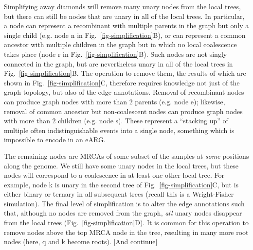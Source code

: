\documentclass{article}
\begin{document}
Simplifying away diamonds will remove many unary nodes from the
local trees, but there can still be nodes that are unary in all
of the local trees. In particular, a node can represent a recombinant
with multiple parents in the graph but only a single child (e.g. node \textsf{n}
in Fig.~\ref{fig-simplification}B), or can represent a common ancestor with
multiple children in the graph but in which no local coalescence takes place
(node \textsf{r} in Fig.~\ref{fig-simplification}B).
Such nodes are not singly connected in the graph, but are nevertheless unary in
all of the local trees in Fig.~\ref{fig-simplification}B. The operation to remove them,
the results of which are shown in Fig.~\ref{fig-simplification}C,
therefore requires knowledge not just of the graph topology, but also of the
edge annotations. Removal of recombinant nodes can produce graph nodes with
more than 2 parents (e.g. node \textsf{e}); likewise, removal of
common ancestor but non-coalescent nodes can produce graph nodes with
more than 2 children (e.g. node \textsf{s}). These represent a ``stacking up'' of multiple
often indistinguishable events into a single node, something which is impossible
to encode in an eARG.

The remaining nodes are MRCAs of some subset of the samples
at \emph{some} positions along the genome. We still have
some unary nodes in the local trees, but these nodes will
correspond to a coalescence in at least one other
local tree. For example, node  \textsf{k} is unary in the second tree
of Fig.~\ref{fig-simplification}C, but is either binary
or ternary in all subsequent trees (recall this is a Wright-Fisher
simulation). The final level of simplification is to alter the edge annotations
such that, although no nodes are removed from the graph, \emph{all}
unary nodes disappear from the local trees (Fig.~\ref{fig-simplification}D).
It is common for this operation to remove nodes above the top MRCA node
in the tree, resulting in many more root nodes (here, \textsf{q} and \textsf{k}
become roots). [And continue]
\end{document}
